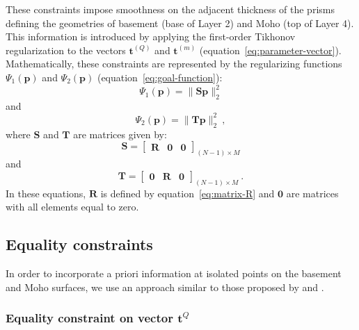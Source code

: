 \documentclass[manuscript]{geophysics}
\begin{document}
These constraints impose smoothness on the adjacent thickness of the prisms defining
the geometries of basement (base of Layer 2) and Moho (top of Layer 4). 
This information is introduced by applying the first-order Tikhonov regularization
\citep{aster-etal2005} to the vectors $\mathbf{t}^{(Q)}$ and $\mathbf{t}^{(m)}$ 
(equation~\ref{eq:parameter-vector}). 
Mathematically, these constraints are represented by the regularizing functions
$\Psi_{1}(\mathbf{p})$ and $\Psi_{2}(\mathbf{p})$ (equation~\ref{eq:goal-function}):
\begin{equation}
\Psi_{1}(\mathbf{p}) = \| \mathbf{S}\mathbf{p} \|_{2}^{2}
\label{eq:smootheness-contraint-basement}
\end{equation}
and 
\begin{equation}
\Psi_{2}(\mathbf{p}) = \| \mathbf{T}\mathbf{p} \|_{2}^{2} \: ,
\label{eq:smootheness-contraint-moho}
\end{equation}
where $\mathbf{S}$ and $\mathbf{T}$ are matrices given by:
\begin{equation}
\mathbf{S} = \begin{bmatrix}
\mathbf{R} & \mathbf{0} & \mathbf{0}
\end{bmatrix}_{\left( N-1 \right) \times M}
\label{eq:matrix-S}
\end{equation}
and
\begin{equation}
\mathbf{T} = \begin{bmatrix}
\mathbf{0} & \mathbf{R} & \mathbf{0}
\end{bmatrix}_{\left( N-1 \right) \times M} \: .
\label{eq:matrix-T}
\end{equation}
In these equations, $\mathbf{R}$ is defined by equation~\ref{eq:matrix-R} 
and $\mathbf{0}$ are matrices with all elements equal to zero.


\subsection{Equality constraints}

In order to incorporate a priori information at isolated points on the basement
and Moho surfaces, we use an approach similar to those proposed by
\citet{barbosa-etal1997} and \citet{barbosa-etal1999b}. 

\subsubsection*{Equality constraint on vector $\mathbf{t}^{Q}$}
\end{document}
